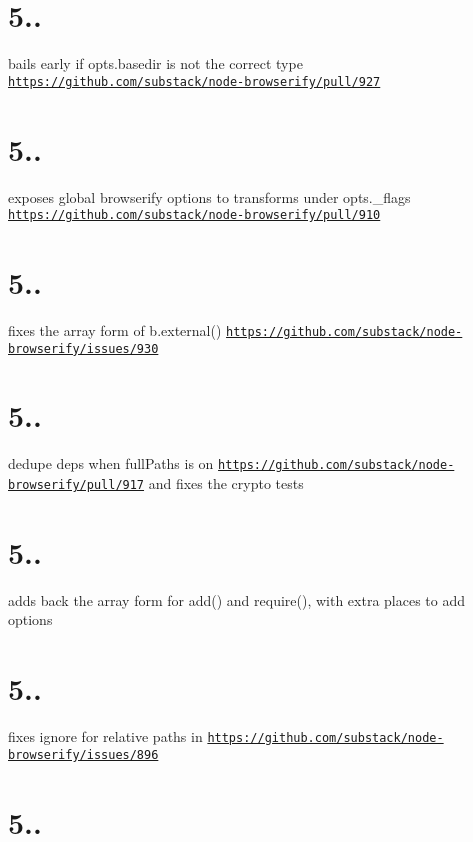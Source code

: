 \section*{5..}

bails early if opts.\+basedir is not the correct type \href{https://github.com/substack/node-browserify/pull/927}{\tt https\+://github.\+com/substack/node-\/browserify/pull/927}

\section*{5..}

exposes global browserify options to transforms under opts.\+\_\+flags \href{https://github.com/substack/node-browserify/pull/910}{\tt https\+://github.\+com/substack/node-\/browserify/pull/910}

\section*{5..}

fixes the array form of b.\+external() \href{https://github.com/substack/node-browserify/issues/930}{\tt https\+://github.\+com/substack/node-\/browserify/issues/930}

\section*{5..}

dedupe deps when full\+Paths is on \href{https://github.com/substack/node-browserify/pull/917}{\tt https\+://github.\+com/substack/node-\/browserify/pull/917} and fixes the crypto tests

\section*{5..}

adds back the array form for add() and require(), with extra places to add options

\section*{5..}

fixes ignore for relative paths in \href{https://github.com/substack/node-browserify/issues/896}{\tt https\+://github.\+com/substack/node-\/browserify/issues/896}

\section*{5..}

